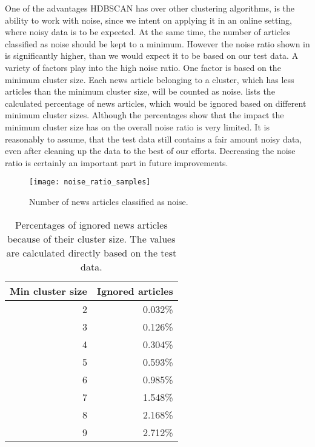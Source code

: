 One of the advantages HDBSCAN has over other clustering algorithms,
is the ability to work with noise, since we intent on applying it in an online setting,
where noisy data is to be expected.
At the same time, the number of articles classified as noise should be kept to a minimum.
However the noise ratio shown in  is significantly higher,
than we would expect it to be based on our test data.
A variety of factors play into the high noise ratio.
One factor is based on the minimum cluster size.
Each news article belonging to a cluster,
which has less articles than the minimum cluster size, will be counted as noise.
 lists the calculated percentage of news articles,
which would be ignored based on different minimum cluster sizes.
Although the percentages show that the impact the minimum cluster size has on the overall noise ratio is very limited.
It is reasonably to assume, that the test data still contains a fair amount noisy data,
even after cleaning up the data to the best of our efforts.
Decreasing the noise ratio is certainly an important part in future improvements.

\begin{figure}[h]
    \centering
    \texttt{[image: noise\_ratio\_samples]}
    \caption{Number of news articles classified as noise.}
    \label{fig:noise_ratio_samples}
\end{figure}

\begin{table}[h]
    \centering
    \begin{tabular}{|r|r|}
        \hline
        \textbf{Min cluster size} & \textbf{Ignored articles} \\
        \hline
        2 & 0.032\% \\ \hline
        3 & 0.126\% \\ \hline
        4 & 0.304\% \\ \hline
        5 & 0.593\% \\ \hline
        6 & 0.985\% \\ \hline
        7 & 1.548\% \\ \hline
        8 & 2.168\% \\ \hline
        9 & 2.712\% \\ \hline
    \end{tabular}
    \caption{
        Percentages of ignored news articles because of their cluster size.
        The values are calculated directly based on the test data.
    }
    \label{tab:expected_noise}
\end{table}

